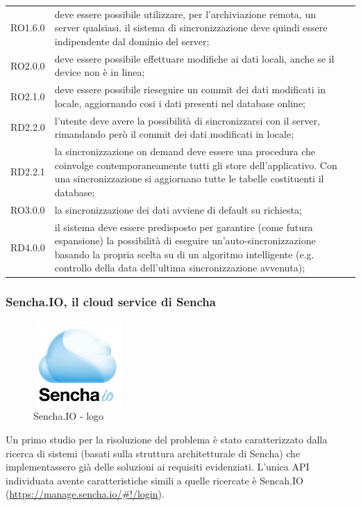 \documentclass[10pt,a4paper,onecolumn]{article}
\begin{document}
\begin{center}
\begin{longtable}{lp{}l}
RO1.6.0 & deve essere possibile utilizzare, per l'archiviazione remota, un server qualsiasi. il sistema di sincronizzazione deve quindi essere indipendente dal dominio del server;\\
RO2.0.0 & deve essere possibile effettuare modifiche ai dati locali, anche se il device non è in linea;\\
RO2.1.0 & deve essere possibile rieseguire un commit dei dati modificati in locale, aggiornando cosi i dati presenti nel database online;\\
RD2.2.0 & l'utente deve avere la possibilità di sincronizzarsi con il server, rimandando però il commit dei dati modificati in locale;\\
RD2.2.1 & la sincronizzazione on demand deve essere una procedura che coinvolge contemporaneamente tutti gli store dell'applicativo. Con una sincronizzazione si aggiornano tutte le tabelle costituenti il database;\\
RO3.0.0 & la sincronizzazione dei dati avviene di default su richiesta;\\
RD4.0.0 & il sistema deve essere predisposto per garantire (come futura espansione) la possibilità di eseguire un'auto-sincronizzazione basando la propria scelta su di un algoritmo intelligente (e.g. controllo della data dell'ultima sincronizzazione avvenuta);\\
\bottomrule
\end{longtable}
\end{center}

\subsubsection{Sencha.IO, il cloud service di Sencha}

\begin{figure}[h]
	\centering
	\includegraphics[width=0.3\textwidth]{img/Sencha-io}
	\caption{Sencha.IO - logo}						
	\label{fig:senchaIO logo}
\end{figure}

Un primo studio per la risoluzione del problema è stato caratterizzato dalla ricerca di sistemi (basati sulla struttura architetturale di Sencha) che implementassero già delle soluzioni ai requisiti evidenziati. L'unica API individuata avente caratteristiche simili a quelle ricercate è Sencah.IO (\url{https://manage.sencha.io/#!/login}).
\end{document}
